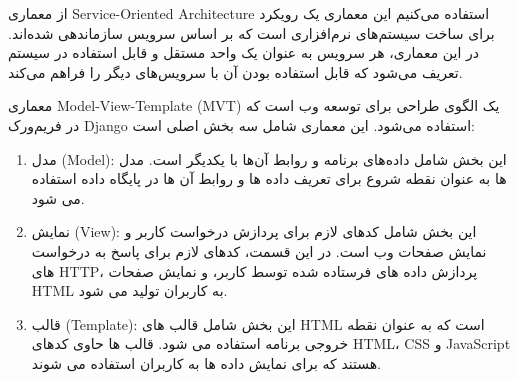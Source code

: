 از معماری Service-Oriented Architecture استفاده می‌کنیم این معماری یک رویکرد برای ساخت سیستم‌های نرم‌افزاری است که بر اساس سرویس سازماندهی شده‌اند. در این معماری، هر سرویس به عنوان یک واحد مستقل و قابل استفاده در سیستم تعریف می‌شود که قابل استفاده بودن آن با سرویس‌های دیگر را فراهم می‌کند.

معماری Model-View-Template (MVT) یک الگوی طراحی برای توسعه وب است که در فریم‌ورک Django استفاده می‌شود. این معماری شامل سه بخش اصلی است:

\begin{enumerate}
\item مدل (Model): این بخش شامل داده‌های برنامه و روابط آن‌ها با یکدیگر است. مدل ها به عنوان نقطه شروع برای تعریف داده ها و روابط آن ها در پایگاه داده استفاده می شود.

\item نمایش (View): این بخش شامل کدهای لازم برای پردازش درخواست کاربر و نمایش صفحات وب است. در این قسمت، کدهای لازم برای پاسخ به درخواست های HTTP، پردازش داده های فرستاده شده توسط کاربر، و نمایش صفحات HTML به کاربران تولید می شود.

\item قالب (Template): این بخش شامل قالب های HTML است که به عنوان نقطه خروجی برنامه استفاده می شود. قالب ها حاوی کدهای HTML، CSS و JavaScript هستند که برای نمایش داده ها به کاربران استفاده می شوند.
\end{enumerate}
